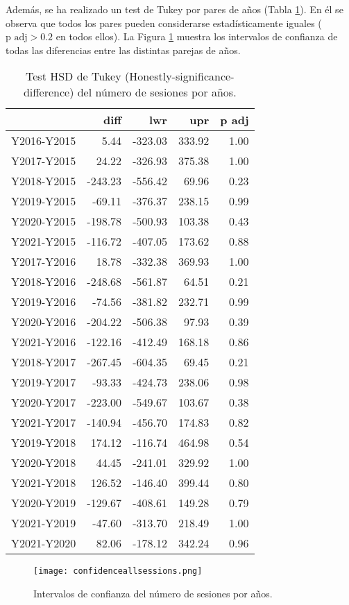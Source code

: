 Además, se ha realizado un test de Tukey por pares de años (Tabla \ref{tab:Tukeynumsessions}). En él se observa que todos los pares pueden considerarse estadísticamente iguales ($\text{p adj} > 0.2$ en todos ellos). La Figura \ref{fig:confidencenumsessions} muestra los intervalos de confianza de todas las diferencias entre las distintas parejas de años.

\begin{table}[ht]
\centering
\caption{Test HSD de Tukey (Honestly-significance-difference) del número de sesiones por años.}
\label{tab:Tukeynumsessions}
\begin{tabular}{rrrrr}
  \hline
 & diff & lwr & upr & p adj \\ 
  \hline
Y2016-Y2015 & 5.44 & -323.03 & 333.92 & 1.00 \\ 
  Y2017-Y2015 & 24.22 & -326.93 & 375.38 & 1.00 \\ 
  Y2018-Y2015 & -243.23 & -556.42 & 69.96 & 0.23 \\ 
  Y2019-Y2015 & -69.11 & -376.37 & 238.15 & 0.99 \\ 
  Y2020-Y2015 & -198.78 & -500.93 & 103.38 & 0.43 \\ 
  Y2021-Y2015 & -116.72 & -407.05 & 173.62 & 0.88 \\ 
  Y2017-Y2016 & 18.78 & -332.38 & 369.93 & 1.00 \\ 
  Y2018-Y2016 & -248.68 & -561.87 & 64.51 & 0.21 \\ 
  Y2019-Y2016 & -74.56 & -381.82 & 232.71 & 0.99 \\ 
  Y2020-Y2016 & -204.22 & -506.38 & 97.93 & 0.39 \\ 
  Y2021-Y2016 & -122.16 & -412.49 & 168.18 & 0.86 \\ 
  Y2018-Y2017 & -267.45 & -604.35 & 69.45 & 0.21 \\ 
  Y2019-Y2017 & -93.33 & -424.73 & 238.06 & 0.98 \\ 
  Y2020-Y2017 & -223.00 & -549.67 & 103.67 & 0.38 \\ 
  Y2021-Y2017 & -140.94 & -456.70 & 174.83 & 0.82 \\ 
  Y2019-Y2018 & 174.12 & -116.74 & 464.98 & 0.54 \\ 
  Y2020-Y2018 & 44.45 & -241.01 & 329.92 & 1.00 \\ 
  Y2021-Y2018 & 126.52 & -146.40 & 399.44 & 0.80 \\ 
  Y2020-Y2019 & -129.67 & -408.61 & 149.28 & 0.79 \\ 
  Y2021-Y2019 & -47.60 & -313.70 & 218.49 & 1.00 \\ 
  Y2021-Y2020 & 82.06 & -178.12 & 342.24 & 0.96 \\ 
   \hline
\end{tabular}
\end{table}

\begin{figure}[H]
    \centering
    \texttt{[image: confidenceallsessions.png]}
    \caption{Intervalos de confianza del número de sesiones por años.}
    \label{fig:confidencenumsessions}
\end{figure}